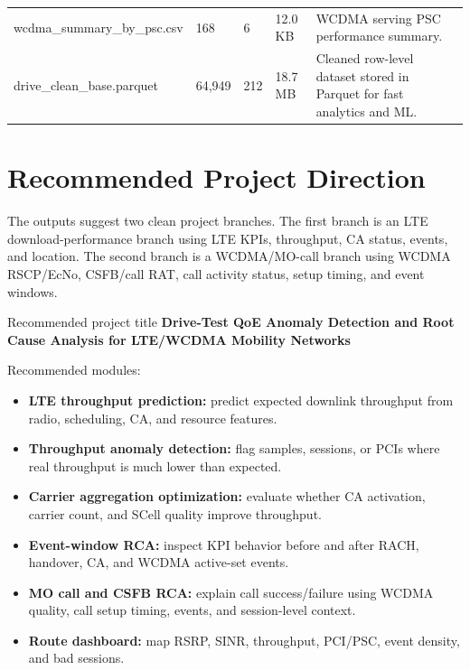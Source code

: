 \documentclass[12pt,a4paper]{article}
\begin{document}
\begin{landscape}
\begin{center}
\begin{tabularx}{\linewidth}{P{5.8cm}C{1.5cm}C{1.0cm}C{1.6cm}Y}
{\ttfamily wcdma\_\allowbreak{}summary\_\allowbreak{}by\_\allowbreak{}psc.\allowbreak{}csv} & 168 & 6 & 12.0 KB & WCDMA serving PSC performance summary. \\
{\ttfamily drive\_\allowbreak{}clean\_\allowbreak{}base.\allowbreak{}parquet} & 64,949 & 212 & 18.7 MB & Cleaned row-level dataset stored in Parquet for fast analytics and ML. \\
\bottomrule
\end{tabularx}
\end{center}
\end{landscape}

\section{Recommended Project Direction}

The outputs suggest two clean project branches. The first branch is an LTE download-performance branch using LTE KPIs, throughput, CA status, events, and location. The second branch is a WCDMA/MO-call branch using WCDMA RSCP/EcNo, CSFB/call RAT, call activity status, setup timing, and event windows.

\begin{successbox}{Recommended project title}
\textbf{Drive-Test QoE Anomaly Detection and Root Cause Analysis for LTE/WCDMA Mobility Networks}
\end{successbox}

Recommended modules:
\begin{itemize}
    \item \textbf{LTE throughput prediction:} predict expected downlink throughput from radio, scheduling, CA, and resource features.
    \item \textbf{Throughput anomaly detection:} flag samples, sessions, or PCIs where real throughput is much lower than expected.
    \item \textbf{Carrier aggregation optimization:} evaluate whether CA activation, carrier count, and SCell quality improve throughput.
    \item \textbf{Event-window RCA:} inspect KPI behavior before and after RACH, handover, CA, and WCDMA active-set events.
    \item \textbf{MO call and CSFB RCA:} explain call success/failure using WCDMA quality, call setup timing, events, and session-level context.
    \item \textbf{Route dashboard:} map RSRP, SINR, throughput, PCI/PSC, event density, and bad sessions.
\end{itemize}
\end{document}
